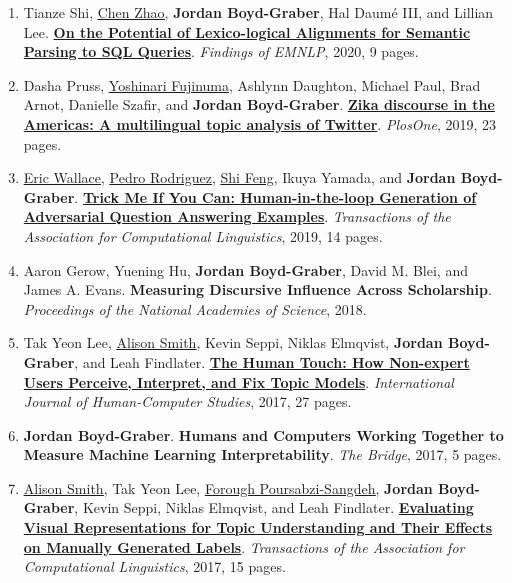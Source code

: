 {\begin{enumerate}
	 \item Tianze Shi, \underline{\href{https://henryzhao5852.github.io/}{Chen Zhao}}, {\bf Jordan Boyd-Graber}, Hal {Daum\'{e} III}, and Lillian Lee.  {\bf \href{http://cs.umd.edu/~jbg//docs/2020_findings_qalign.pdf}{On the Potential of Lexico-logical Alignments for Semantic Parsing to SQL Queries}}.  \emph{Findings of EMNLP}, 2020, 9 pages.

	 \item Dasha Pruss, \underline{\href{http://akkikiki.github.io/about/}{Yoshinari Fujinuma}}, Ashlynn Daughton, Michael Paul, Brad Arnot, Danielle Szafir, and {\bf Jordan Boyd-Graber}.  {\bf \href{https://journals.plos.org/plosone/article?id=10.1371/journal.pone.0216922}{Zika discourse in the Americas: A multilingual topic analysis of {Twitter}}}.  \emph{PlosOne}, 2019, 23 pages.

	 \item \underline{\href{http://www.ericswallace.com/}{Eric Wallace}}, \underline{\href{https://www.pedro.ai/}{Pedro Rodriguez}}, \underline{\href{https://ihsgnef.github.io/}{Shi Feng}}, Ikuya Yamada, and {\bf Jordan Boyd-Graber}.  {\bf \href{http://cs.umd.edu/~jbg//docs/2019_tacl_trick.pdf}{Trick Me If You Can: Human-in-the-loop Generation of Adversarial Question Answering Examples}}.  \emph{Transactions of the Association for Computational Linguistics}, 2019, 14 pages.

	 \item Aaron Gerow, Yuening Hu, {\bf Jordan Boyd-Graber}, David M. Blei, and James A. Evans.  {\bf Measuring Discursive Influence Across Scholarship}.  \emph{Proceedings of the National Academies of Science}, 2018.

	 \item Tak Yeon Lee, \underline{\href{http://alisonmsmith.github.io/}{Alison Smith}}, Kevin Seppi, Niklas Elmqvist, {\bf Jordan Boyd-Graber}, and Leah Findlater.  {\bf \href{http://cs.umd.edu/~jbg//docs/2017_ijhcs_human_touch.pdf}{The Human Touch: How Non-expert Users Perceive, Interpret, and Fix Topic Models}}.  \emph{International Journal of Human-Computer Studies}, 2017, 27 pages.

	 \item {\bf Jordan Boyd-Graber}.  {\bf Humans and Computers Working Together to Measure Machine Learning Interpretability}.  \emph{The Bridge}, 2017, 5 pages.

	 \item \underline{\href{http://alisonmsmith.github.io/}{Alison Smith}}, Tak Yeon Lee, \underline{\href{https://www.microsoft.com/en-us/research/people/fpoursabzi/projects/}{Forough Poursabzi-Sangdeh}}, {\bf Jordan Boyd-Graber}, Kevin Seppi, Niklas Elmqvist, and Leah Findlater.  {\bf \href{http://cs.umd.edu/~jbg//docs/2017_tacl_eval_tm_viz.pdf}{Evaluating Visual Representations for Topic Understanding and Their Effects on Manually Generated Labels}}.  \emph{Transactions of the Association for Computational Linguistics}, 2017, 15 pages.


\end{enumerate}}
